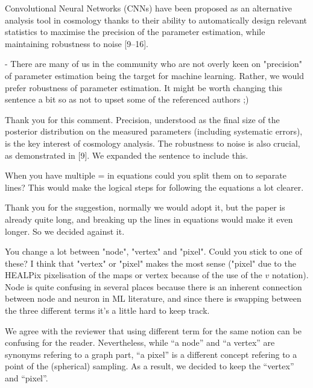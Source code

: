 \documentclass[12pt,a4paper]{article}
\newcommand{\nati}[1]{{\color[rgb]{.1,.6,.1}{NP: #1}}}
\newcommand{\TK}[1]{{\color{red}{TK: #1}}}
\newcommand{\todo}[1]{{\color[rgb]{.6,.1,.6}{TODO: #1}}}
\newcommand{\1}{\b{1}}              %
\newcommand{\0}{\b{0}}              %
\begin{document}
\begin{mdframed}[style=comment]
Convolutional Neural Networks (CNNs) have been proposed as an alternative analysis tool in cosmology thanks to their ability to automatically design relevant statistics to maximise the precision of the parameter estimation, while maintaining robustness to noise [9–16].

- There are many of us in the community who are not overly keen on "precision" of parameter estimation being the target for machine learning. Rather, we would prefer robustness of parameter estimation. It might be worth changing this sentence a bit so as not to upset some of the referenced authors ;)
\end{mdframed}

Thank you for this comment. Precision, understood as the final size of the posterior distribution on the measured parameters (including systematic errors), is the key interest of cosmology analysis.
The robustness to noise is also crucial, as demonstrated in [9]. We expanded the sentence to include this.


\begin{mdframed}[style=comment]
When you have multiple = in equations could you split them on to separate lines? This would make the logical steps for following the equations a lot clearer.
\end{mdframed}
Thank you for the suggestion, normally we would adopt it, but the paper is already quite long, and breaking up the lines in equations would make it even longer. So we decided against it.

\begin{mdframed}[style=comment]
You change a lot between "node", "vertex" and "pixel". Could you stick to one of these? I think that "vertex" or "pixel" makes the most sense ("pixel" due to the HEALPix pixelisation of the maps or vertex because of the use of the $v$ notation). Node is quite confusing in several places because there is an inherent connection between node and neuron in ML literature, and since there is swapping between the three different terms it's a little hard to keep track.
\end{mdframed}
We agree with the reviewer that using different term for the same notion can be confusing for the reader.
Nevertheless, while ``a node'' and ``a vertex'' are synonyms refering to a graph part, ``a pixel'' is a different concept refering to a point of the (spherical) sampling.
As a result, we decided to keep the ``vertex'' and ``pixel''.
\end{document}
